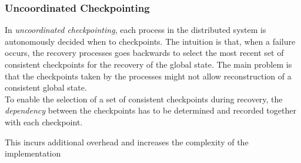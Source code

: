 \documentclass[11pt, a4paper]{article}
\begin{document}
\subsubsection{Uncoordinated Checkpointing}\label{sec:uncoordinated_checkpointing} %
In \textit{uncoordinated checkpointing}, each process in the distributed system is autonomously decided when to checkpoints.
The intuition is that, when a failure occurs, the recovery processes goes backwards to select the most recent set of consistent checkpoints for the recovery of the global state.
The main problem is that the checkpoints taken by the processes might not allow reconstruction of a consistent global state.
\\
To enable the selection of a set of consistent checkpoints during recovery, the \textit{dependency} between the checkpoints has to be determined and recorded together with each checkpoint.
\begin{warning}{}{}
    This incurs additional overhead and increases the complexity of the implementation
\end{warning}
%
\end{document}

